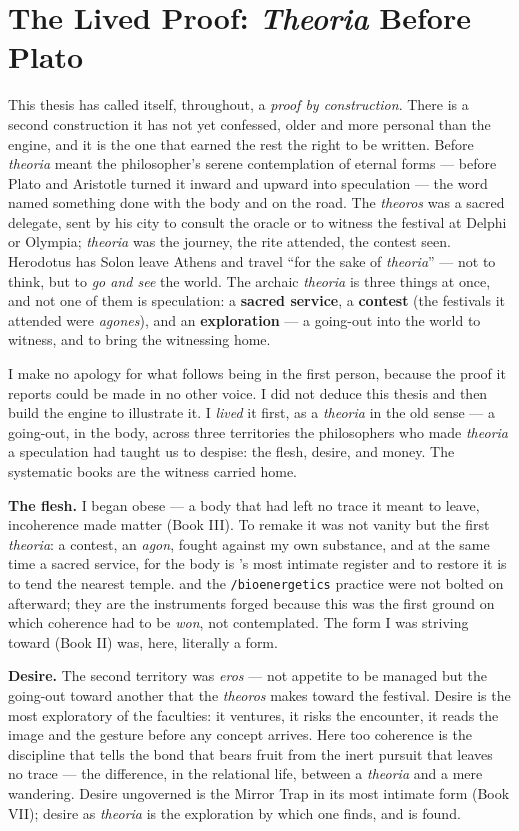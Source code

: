 \section*{The Lived Proof: \emph{Theoria} Before Plato}

This thesis has called itself, throughout, a \emph{proof by construction}. There is a
second construction it has not yet confessed, older and more personal than the
engine, and it is the one that earned the rest the right to be written. Before
\emph{theoria} meant the philosopher's serene contemplation of eternal forms --- before
Plato and Aristotle turned it inward and upward into speculation --- the word named
something done with the body and on the road. The \emph{theoros} was a sacred
delegate, sent by his city to consult the oracle or to witness the festival at Delphi
or Olympia; \emph{theoria} was the journey, the rite attended, the contest seen.
Herodotus has Solon leave Athens and travel ``for the sake of \emph{theoria}'' --- not
to think, but to \emph{go and see} the world. The archaic \emph{theoria} is three
things at once, and not one of them is speculation: a \textbf{sacred service}, a
\textbf{contest} (the festivals it attended were \emph{agones}), and an
\textbf{exploration} --- a going-out into the world to witness, and to bring the
witnessing home.

I make no apology for what follows being in the first person, because the proof it
reports could be made in no other voice. I did not deduce this thesis and then build
the engine to illustrate it. I \emph{lived} it first, as a \emph{theoria} in the old
sense --- a going-out, in the body, across three territories the philosophers who made
\emph{theoria} a speculation had taught us to despise: the flesh, desire, and money.
The systematic books are the witness carried home.

\textbf{The flesh.} I began obese --- a body that had left no trace it meant to leave,
incoherence made matter (Book III). To remake it was not vanity but the first
\emph{theoria}: a contest, an \emph{agon}, fought against my own substance, and at the
same time a sacred service, for the body is \physis's most intimate register and to
restore it is to tend the nearest temple.  and the
\texttt{/bioenergetics} practice were not bolted on afterward; they are the instruments
forged because this was the first ground on which coherence had to be \emph{won}, not
contemplated. The form I was striving toward (Book II) was, here, literally a form.

\textbf{Desire.} The second territory was \emph{eros} --- not appetite to be managed
but the going-out toward another that the \emph{theoros} makes toward the festival.
Desire is the most exploratory of the faculties: it ventures, it risks the encounter,
it reads the image and the gesture before any concept arrives. Here too coherence is
the discipline that tells the bond that bears fruit from the inert pursuit that leaves
no trace --- the difference, in the relational life, between a \emph{theoria} and a
mere wandering. Desire ungoverned is the Mirror Trap in its most intimate form (Book
VII); desire as \emph{theoria} is the exploration by which one finds, and is found.

